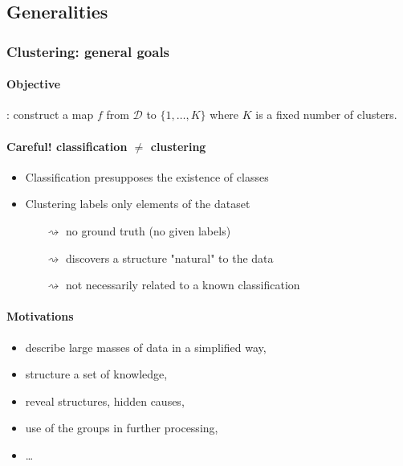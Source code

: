 \documentclass{beamer}\usepackage[]{graphicx}\usepackage[]{color}
\begin{document}
\subsection{Generalities}

\begin{frame}[label=Clustering1]
  \frametitle{Clustering: general goals}

  \paragraph{Objective}: construct a map $f$ from $\mathcal{D}$ to $\{1,\ldots,K\}$ where $K$ is a fixed number of clusters.
    
  \vfill
    
  \paragraph{Careful! classification $\neq$ clustering}
      \begin{itemize}
      \item Classification presupposes the existence of classes
      \item Clustering labels only elements of the dataset
      \begin{itemize}
      \item[$\rightsquigarrow$] no ground truth (no given labels)
      \item[$\rightsquigarrow$] discovers a structure "natural" to the data
      \item[$\rightsquigarrow$] not necessarily related to a known classification
      \end{itemize}
      \end{itemize}
  
  \vfill

  \paragraph{Motivations}
    \begin{itemize}
    \item describe large masses of data in a simplified way,
    \item structure a set of knowledge,
    \item reveal structures, hidden causes,
    \item use of the groups in further processing, 
    \item \dots
  \end{itemize}

\end{frame}
\end{document}
